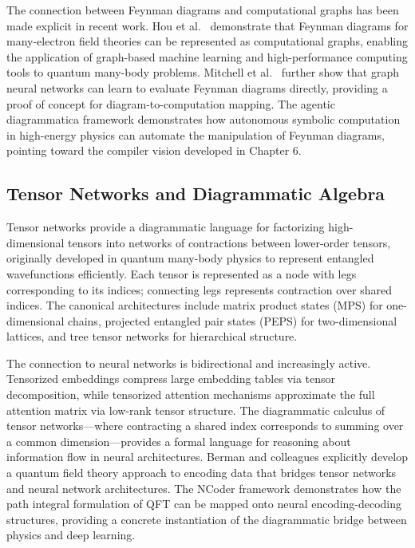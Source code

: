 \documentclass[12pt,a4paper]{article}
\begin{document}
The connection between Feynman diagrams and computational graphs has been made explicit in recent work. Hou et al.~\cite{hou2024feynman} demonstrate that Feynman diagrams for many-electron field theories can be represented as computational graphs, enabling the application of graph-based machine learning and high-performance computing tools to quantum many-body problems. Mitchell et al.~\cite{mitchell2022learning} further show that graph neural networks can learn to evaluate Feynman diagrams directly, providing a proof of concept for diagram-to-computation mapping. The agentic diagrammatica framework \cite{agentic2026agentic} demonstrates how autonomous symbolic computation in high-energy physics can automate the manipulation of Feynman diagrams, pointing toward the compiler vision developed in Chapter 6.

\subsection{Tensor Networks and Diagrammatic Algebra}

Tensor networks provide a diagrammatic language for factorizing high-dimensional tensors into networks of contractions between lower-order tensors, originally developed in quantum many-body physics to represent entangled wavefunctions efficiently. Each tensor is represented as a node with legs corresponding to its indices; connecting legs represents contraction over shared indices. The canonical architectures include matrix product states (MPS) for one-dimensional chains, projected entangled pair states (PEPS) for two-dimensional lattices, and tree tensor networks for hierarchical structure.

The connection to neural networks is bidirectional and increasingly active. Tensorized embeddings compress large embedding tables via tensor decomposition, while tensorized attention mechanisms approximate the full attention matrix via low-rank tensor structure. The diagrammatic calculus of tensor networks---where contracting a shared index corresponds to summing over a common dimension---provides a formal language for reasoning about information flow in neural architectures. Berman and colleagues \cite{berman2024ncoder} explicitly develop a quantum field theory approach to encoding data that bridges tensor networks and neural network architectures. The NCoder framework demonstrates how the path integral formulation of QFT can be mapped onto neural encoding-decoding structures, providing a concrete instantiation of the diagrammatic bridge between physics and deep learning.
\end{document}

